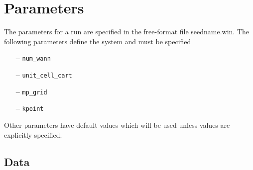 \chapter{Parameters}

The parameters for a run are specified in the free-format file
seedname.win. The following parameters define the system and must be
specified

\begin{itemize}
\item[{\bf --}] \verb#num_wann#
\item[{\bf --}] \verb#unit_cell_cart#
\item[{\bf --}] \verb#mp_grid#
\item[{\bf --}] \verb#kpoint#
\end{itemize}

Other parameters have default values which will be used unless values
are explicitly specified.



\section{Data}
\label{parameter_data}

